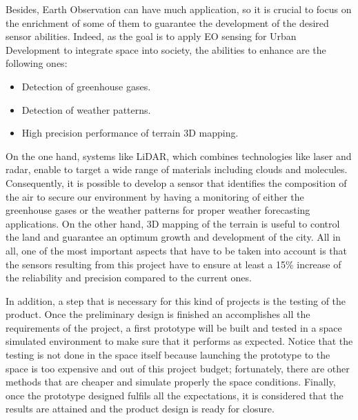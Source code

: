 Besides, Earth Observation can have much application, so it is crucial to focus on the enrichment of some of them to guarantee the development of the desired sensor abilities. Indeed, as the goal is to apply EO sensing for Urban Development to integrate space into society, the abilities to enhance are the following ones:
\begin{itemize}
	\item Detection of greenhouse gases. 
	\item Detection of weather patterns.
	\item High precision performance of terrain 3D mapping. 
\end{itemize} 
On the one hand, systems like LiDAR, which combines technologies like laser and radar, enable to target a wide range of materials including clouds and molecules. Consequently, it is possible to develop a sensor that identifies the composition of the air to secure our environment by having a monitoring of either the greenhouse gases or the weather patterns for proper weather forecasting applications. On the other hand, 3D mapping of the terrain is useful to control the land and guarantee an optimum growth and development of the city. All in all, one of the most important aspects that have to be taken into account is that the sensors resulting from this project have to ensure at least a 15\% increase of the reliability and precision compared to the current ones.  

In addition, a step that is necessary for this kind of projects is the testing of the product. Once the preliminary design is finished an accomplishes all the requirements of the project, a first prototype will be built and tested in a space simulated environment to make sure that it performs as expected. Notice that the testing is not done in the space itself because launching the prototype to the space is too expensive and out of this project budget; fortunately, there are other methods that are cheaper and simulate properly the space conditions. Finally, once the prototype designed fulfils all the expectations, it is considered that the results are attained and the product design is ready for closure. 